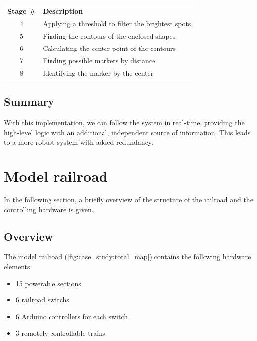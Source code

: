 \begin{table}[p]
\begin{tabularx}{\textwidth}{cm{5cm}X}
	\end{tabularx}
	\begin{tabularx}{\textwidth}{cX}
		\toprule
		Stage \# & Description  \\
		\midrule
		4 & Applying a threshold to filter the brightest spots \\
		5 & Finding the contours of the enclosed shapes \\
		6 & Calculating the center point of the contours \\
		7 & Finding possible markers by distance \\
		8 & Identifying the marker by the center \\
		\bottomrule
	\end{tabularx}
\end{table}

\subsection{Summary}
With this implementation, we can follow the system in real-time, providing the high-level logic with an additional, independent source of information. This leads to a more robust system with added redundancy.

\newpage
\section{Model railroad}
In the following section, a briefly overview of the structure of the railroad and the controlling hardware is given.

\subsection{Overview}

\noindent The model railroad (\cref{fig:case_study:total_map}) contains the following hardware elements:
\begin{itemize}
	\item 15 powerable sections
	\item 6 railroad switchs
	\item 6 Arduino controllers for each switch
	\item 3 remotely controllable trains
\end{itemize}

